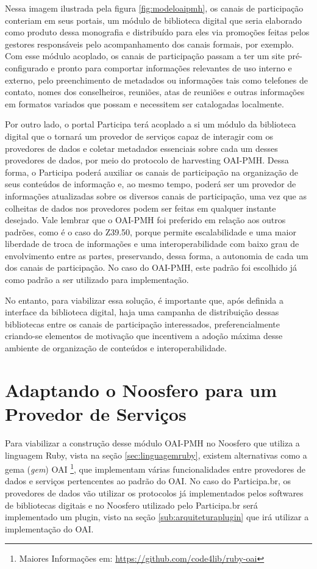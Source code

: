 Nessa imagem ilustrada pela figura \ref{fig:modeloaipmh}, os canais de participação conteriam em seus portais, um módulo de biblioteca digital que seria elaborado como produto dessa monografia e distribuído para eles via promoções feitas pelos gestores responsáveis pelo acompanhamento dos canais formais, por exemplo. Com esse módulo acoplado, os canais de participação passam a ter um site pré-configurado e pronto para comportar informações relevantes de uso interno e externo, pelo preenchimento de metadados ou informações tais como telefones de contato, nomes dos conselheiros, reuniões, atas de reuniões e outras informações em formatos variados que possam e necessitem ser catalogadas localmente.

Por outro lado, o portal Participa terá acoplado a si um módulo da biblioteca digital que o tornará um provedor de serviços capaz de interagir com os provedores de dados e coletar metadados essenciais sobre cada um desses provedores de dados, por meio do protocolo de harvesting OAI-PMH. Dessa forma, o Participa poderá auxiliar os canais de participação na organização de seus conteúdos de informação e, ao mesmo tempo, poderá ser um provedor de informações atualizadas sobre os diversos canais de participação, uma vez que as colheitas de dados nos provedores podem ser feitas em qualquer instante desejado. Vale lembrar que o OAI-PMH foi preferido em relação aos outros padrões, como é o caso do Z39.50, porque permite escalabilidade e uma maior liberdade de troca de informações e uma interoperabilidade com baixo grau de envolvimento entre as partes, preservando, dessa forma, a autonomia de cada um dos canais de participação. No caso do OAI-PMH, este padrão foi escolhido já como padrão a ser utilizado para implementação. 

No entanto, para viabilizar essa solução, é importante que, após definida a interface da biblioteca digital, haja uma campanha de distribuição dessas bibliotecas entre os canais de participação interessados, preferencialmente criando-se elementos de motivação que incentivem a adoção máxima desse ambiente de organização de conteúdos e interoperabilidade.

\section{Adaptando o Noosfero para um Provedor de Serviços}

Para viabilizar a construção desse módulo OAI-PMH no Noosfero que utiliza a linguagem Ruby, vista na seção \ref{sec:linguagemruby}, existem alternativas como a gema (\textit{gem}) OAI \footnote{Maiores Informações em: \url{https://github.com/code4lib/ruby-oai}}, que implementam várias funcionalidades entre provedores de dados e serviços pertencentes ao padrão do OAI. No caso do Participa.br, os provedores de dados vão utilizar os protocolos já implementados pelos softwares de bibliotecas digitais e no Noosfero utilizado pelo Participa.br será implementado um plugin, visto na seção \ref{sub:arquiteturaplugin} que irá utilizar a implementação do OAI.

